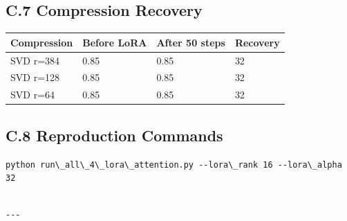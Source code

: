 \subsection{C.7 Compression Recovery}

\begin{table}[H]
\centering
\small
\begin{tabular}{llll}
\toprule
\textbf{Compression} & \textbf{Before LoRA} & \textbf{After 50 steps} & \textbf{Recovery} \\
\midrule
SVD r=384 & 0.85 & 0.85 & 32 \\
SVD r=128 & 0.85 & 0.85 & 32 \\
SVD r=64 & 0.85 & 0.85 & 32 \\
\bottomrule
\end{tabular}
\end{table}

\subsection{C.8 Reproduction Commands}

\begin{lstlisting}
python run\_all\_4\_lora\_attention.py --lora\_rank 16 --lora\_alpha 32
\end{lstlisting}
\begin{lstlisting}

---
\end{lstlisting}
